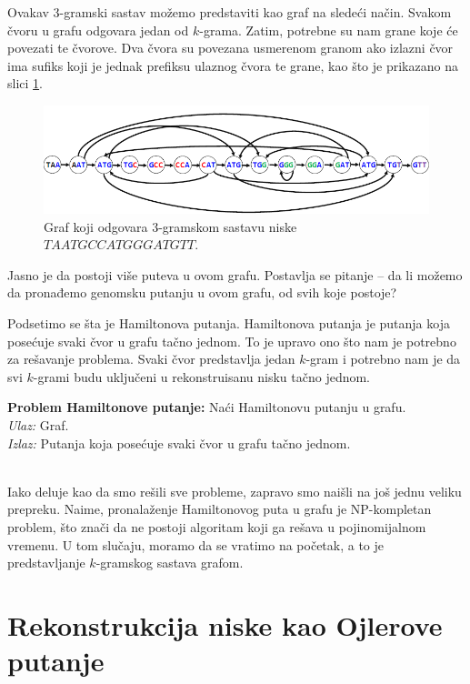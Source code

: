 Ovakav 3-gramski sastav mo\v zemo predstaviti kao graf na slede\'ci na\v cin. Svakom \v cvoru u grafu odgovara jedan od $k$-grama. Zatim, potrebne su nam grane koje će povezati te čvorove. Dva čvora su povezana usmerenom granom ako izlazni čvor ima sufiks koji je jednak prefiksu ulaznog čvora te grane, kao što je prikazano na slici \ref{slika:hamilton}.

\begin{figure}[H]
	\centering
	\includegraphics[width=1\textwidth]{poglavlja/3/slike/hamilton.png}
	\caption{Graf koji odgovara 3-gramskom sastavu niske $TAATGCCATGGGATGTT$.}
	\label{slika:hamilton}
\end{figure} 

Jasno je da postoji više puteva u ovom grafu. Postavlja se pitanje -- da li možemo da pronađemo genomsku putanju u ovom grafu, od svih koje postoje?

Podsetimo se šta je Hamiltonova putanja. Hamiltonova putanja je putanja koja posećuje svaki čvor u grafu tačno jednom. To je upravo ono što nam je potrebno za rešavanje problema. Svaki čvor predstavlja jedan $k$-gram i potrebno nam je da svi $k$-grami budu uključeni u rekonstruisanu nisku tačno jednom.
~ \\
\begin{tcolorbox}
	\textbf{Problem Hamiltonove putanje:} Naći Hamiltonovu putanju u grafu. \\
	\textit{Ulaz:} Graf.\\
	\textit{Izlaz:} Putanja koja posećuje svaki čvor u grafu tačno jednom.
\end{tcolorbox}

~\\

Iako deluje kao da smo rešili sve probleme, zapravo smo naišli na još jednu veliku prepreku. Naime, pronalaženje Hamiltonovog puta u grafu je NP-kompletan problem, što znači da ne postoji algoritam koji ga rešava u pojinomijalnom vremenu. U tom slučaju, moramo da se vratimo na početak, a to je predstavljanje $k$-gramskog sastava grafom.

\section{Rekonstrukcija niske kao Ojlerove putanje}

